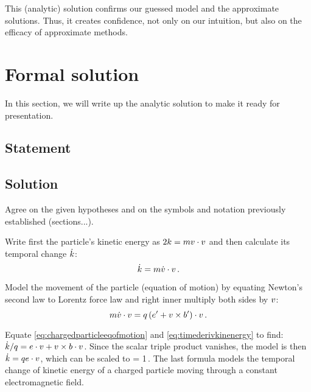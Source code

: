 This (analytic) solution confirms our guessed model and the approximate solutions. Thus, it creates confidence, not only on our intuition, but also on the efficacy of approximate methods.


\section{Formal solution}
%
In this section, we will write up the analytic solution to make it ready for presentation.


\subsection{Statement}
%


\subsection{Solution}
%
Agree on the given hypotheses and on the symbols and notation previously established (sections...).

Write first the particle's kinetic energy as $2k = mv\cdot v$ and then calculate its temporal change $\dot{k}$:
%
\begin{equation}\label{eq:timederivkinenergy}
  \dot{k} = m\dot{v}\cdot v\,.
\end{equation}

Model the movement of the particle (equation of motion) by equating Newton's second law to Lorentz force law and right inner multiply both sides by $v$:
%
\begin{equation}\label{eq:chargedparticleeqofmotion}
  m\dot{v}\cdot v = q\left({e' + v\times b'}\right)\cdot v\,.
\end{equation}


Equate \cref{eq:chargedparticleeqofmotion} and \cref{eq:timederivkinenergy} to find: $\dot{k}/q = e\cdot v + v\times b\cdot v$. Since the scalar triple product vanishes, the model is then $\dot{k} = qe\cdot v$, which can be scaled to 
\beq
  \dfrac{\dt\ekin}{\echarge\efield\iprod\vel} = 1\,.
\eeq
%
The last formula models the temporal change of kinetic energy of a charged particle moving through a constant electromagnetic field.


